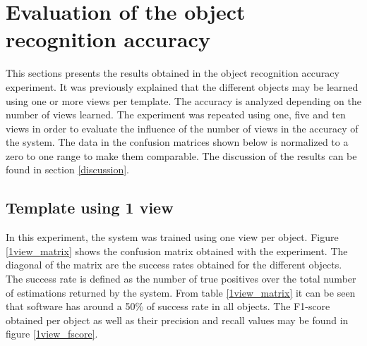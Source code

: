 \newpage
\section{ Evaluation of the object recognition accuracy}
\label{results_accuracy_measurement}
This sections presents the results obtained in the object recognition accuracy experiment. 
It was previously explained that the different objects may be learned using one or more views per template. 
The accuracy is analyzed depending on the number of views learned. 
The experiment was repeated using one, five and ten views in order to evaluate the influence of the number of views in the accuracy of the system. %
The data in the confusion matrices shown below is normalized to a zero to one range to make them comparable.
The discussion of the results can be found in section \ref{discussion}.

\subsection{Template using 1 view}
In this experiment, the system was trained using one view per object. 
Figure \ref{1view_matrix} shows the confusion matrix obtained with the experiment. 
The diagonal of the matrix are the success rates obtained for the different objects. 
The success rate is defined as the number of true positives over the total number of estimations returned by the system. 
From table \ref{1view_matrix} it can be seen that software has around a 50\% of success rate in all objects.
The F1-score obtained per object as well as their precision and recall values may be found in figure \ref{1view_fscore}.


